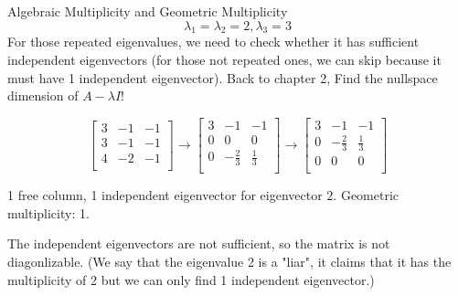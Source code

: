 \documentclass{beamer}
\begin{document}
\begin{frame}{Algebraic Multiplicity and Geometric Multiplicity}
\begin{equation*}
    \lambda _1=\lambda _2=2,\lambda _3=3
\end{equation*}
For those repeated eigenvalues, we need to check whether it has sufficient independent eigenvectors (for those not repeated ones, we can skip because it must have 1 independent eigenvector). Back to chapter 2, Find the nullspace dimension of $A-\lambda I$!

\begin{equation*}
    \left[ \begin{matrix}
        3&		-1&		-1\\
        3&		-1&		-1\\
        4&		-2&		-1\\
    \end{matrix} \right] \rightarrow \left[ \begin{matrix}
        3&		-1&		-1\\
        0&		0&		0\\
        0&		-\frac{2}{3}&		\frac{1}{3}\\
    \end{matrix} \right] \rightarrow \left[ \begin{matrix}
        3&		-1&		-1\\
        0&		-\frac{2}{3}&		\frac{1}{3}\\
        0&		0&		0\\
    \end{matrix} \right]
\end{equation*}

1 free column, 1 independent eigenvector for eigenvector $2$. Geometric multiplicity: 1.
\vspace{3pt}

The independent eigenvectors are not sufficient, so the matrix is not diagonlizable. (We say that the eigenvalue 2 is a "liar", it claims that it has the multiplicity of 2 but we can only find 1 independent eigenvector.)
\end{frame}
\end{document}

